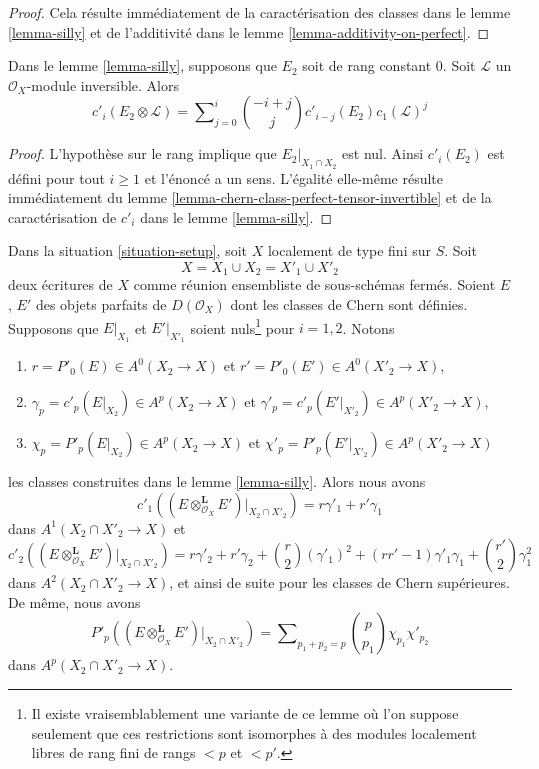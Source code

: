\begin{proof}
Cela résulte immédiatement de la caractérisation des classes dans le
lemme \ref{lemma-silly} et de l'additivité dans le
lemme \ref{lemma-additivity-on-perfect}.
\end{proof}

\begin{lemma}
\label{lemma-silly-tensor-invertible}
Dans le lemme \ref{lemma-silly}, supposons que $E_2$ soit de rang constant $0$.
Soit $\mathcal{L}$ un $\mathcal{O}_X$-module inversible. Alors
$$
c'_i(E_2 \otimes \mathcal{L}) =
\sum\nolimits_{j = 0}^i
\binom{- i + j}{j} c'_{i - j}(E_2) c_1(\mathcal{L})^j
$$
\end{lemma}

\begin{proof}
L'hypothèse sur le rang implique que $E_2|_{X_1 \cap X_2}$ est nul.
Ainsi $c'_i(E_2)$ est défini pour tout $i \geq 1$ et l'énoncé
a un sens. L'égalité elle-même résulte
immédiatement du lemme \ref{lemma-chern-class-perfect-tensor-invertible}
et de la caractérisation de $c'_i$ dans le lemme \ref{lemma-silly}.
\end{proof}

\begin{lemma}
\label{lemma-silly-tensor-product}
Dans la situation \ref{situation-setup}, soit $X$ localement de type fini sur $S$.
Soit
$$
X = X_1 \cup X_2 = X'_1 \cup X'_2
$$
deux écritures de $X$ comme réunion ensembliste de sous-schémas fermés.
Soient $E$, $E'$ des objets parfaits de $D(\mathcal{O}_X)$
dont les classes de Chern sont définies.
Supposons que $E|_{X_1}$ et $E'|_{X'_1}$ soient nuls\footnote{Il existe vraisemblablement
une variante de ce lemme où l'on suppose seulement que ces restrictions sont
isomorphes à des modules localement libres de rang fini
de rangs $< p$ et $< p'$.} pour $i = 1, 2$. Notons
\begin{enumerate}
\item $r = P'_0(E) \in A^0(X_2 \to X)$ et
$r' = P'_0(E') \in A^0(X'_2 \to X)$,
\item $\gamma_p = c'_p(E|_{X_2}) \in A^p(X_2 \to X)$ et
$\gamma'_p = c'_p(E'|_{X'_2}) \in A^p(X'_2 \to X)$,
\item $\chi_p = P'_p(E|_{X_2}) \in A^p(X_2 \to X)$ et
$\chi'_p = P'_p(E'|_{X'_2}) \in A^p(X'_2 \to X)$
\end{enumerate}
les classes construites dans le lemme \ref{lemma-silly}. Alors nous avons
$$
c'_1((E \otimes_{\mathcal{O}_X}^\mathbf{L} E')|_{X_2 \cap X'_2}) =
r \gamma'_1 + r' \gamma_1
$$
dans $A^1(X_2 \cap X'_2 \to X)$ et
$$
c'_2((E \otimes_{\mathcal{O}_X}^\mathbf{L} E')|_{X_2 \cap X'_2}) =
r \gamma'_2 + r' \gamma_2 + {r \choose 2} (\gamma'_1)^2 +
(rr' - 1) \gamma'_1\gamma_1 + {r' \choose 2} \gamma_1^2
$$
dans $A^2(X_2 \cap X'_2 \to X)$, et ainsi de suite pour les classes de Chern supérieures.
De même, nous avons
$$
P'_p((E \otimes_{\mathcal{O}_X}^\mathbf{L} E')|_{X_2 \cap X'_2}) =
\sum\nolimits_{p_1 + p_2 = p}
{p \choose p_1} \chi_{p_1} \chi'_{p_2}
$$
dans $A^p(X_2 \cap X'_2 \to X)$.
\end{lemma}

